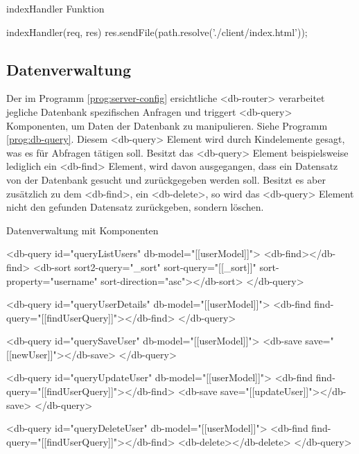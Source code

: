 \begin{program}
\caption{indexHandler Funktion}
\label{prog:indexHandler}
\begin{HtmlCode}
indexHandler(req, res) {
	res.sendFile(path.resolve('./client/index.html'));
}
\end{HtmlCode}
\end{program}

\subsection{Datenverwaltung}
Der im Programm \ref{prog:server-config} ersichtliche <db-router> verarbeitet jegliche Datenbank spezifischen Anfragen und triggert <db-query> Komponenten, um Daten der Datenbank zu manipulieren. Siehe Programm \ref{prog:db-query}. Diesem <db-query> Element wird durch Kindelemente gesagt, was es für Abfragen tätigen soll. Besitzt das <db-query> Element beispielsweise lediglich ein <db-find> Element, wird davon ausgegangen, dass ein Datensatz von der Datenbank gesucht und zurückgegeben werden soll. Besitzt es aber zusätzlich zu dem <db-find>, ein <db-delete>, so wird das <db-query> Element nicht den gefunden Datensatz zurückgeben, sondern löschen. 
 
\begin{program}
\caption{Datenverwaltung mit Komponenten}
\label{prog:db-query}
\begin{HtmlCode}
<db-query id="queryListUsers" db-model="[[userModel]]">
	<db-find></db-find>
	<db-sort sort2-query="{{_sort}}" sort-query="[[_sort]]" sort-property="username"
		sort-direction="asc"></db-sort>
</db-query>
	
<db-query id="queryUserDetails" db-model="[[userModel]]">
	<db-find find-query="[[findUserQuery]]"></db-find>
</db-query>
	
<db-query id="querySaveUser" db-model="[[userModel]]">
	<db-save save="[[newUser]]"></db-save>
</db-query>
	
<db-query id="queryUpdateUser" db-model="[[userModel]]">
	<db-find find-query="[[findUserQuery]]"></db-find>
	<db-save save="[[updateUser]]"></db-save>
</db-query>
	
<db-query id="queryDeleteUser" db-model="[[userModel]]">
	<db-find find-query="[[findUserQuery]]"></db-find>
	<db-delete></db-delete>
</db-query>
\end{HtmlCode}
\end{program}

